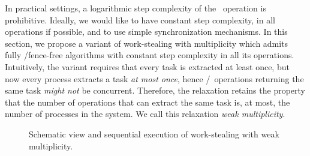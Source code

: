 In practical settings, a logarithmic step complexity of the \Take{}~operation is prohibitive. Ideally, we would like to have constant step complexity, in all operations if possible, and to use simple synchronization mechanisms.  In this section, we propose a variant of work-stealing with multiplicity which admits fully \R/\W fence-free algorithms with constant step complexity in all its operations.  Intuitively, the variant requires that every task is extracted at least once, but now every process extracts a task \emph{at most once}, hence \Take/\Steal~operations returning the same task \emph{might not} be concurrent.  Therefore, the relaxation retains the property that the number of operations that can extract the same task is, at most, the number of processes in the system.  We call this relaxation \emph{weak multiplicity}.

\begin{figure}[!ht]
  \centering
  \hfill
  \caption{\label{fig-weak-mult} Schematic view and sequential
    execution of work-stealing with weak multiplicity.}
\end{figure}



